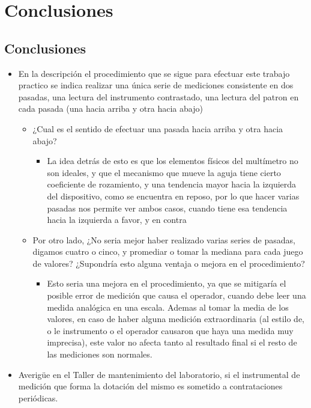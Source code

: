 \chapter{Conclusiones}
\section{Conclusiones}
\begin{itemize}
  \item En la descripción el procedimiento que se sigue para efectuar este trabajo practico se indica realizar una única serie de mediciones consistente en dos pasadas, una lectura del instrumento contrastado, una lectura del patron en cada pasada (una hacia arriba y otra hacia abajo)
  \begin{itemize}
    \item ¿Cual es el sentido de efectuar una pasada hacia arriba y otra hacia abajo?
    \begin{itemize} 
      \item La idea detrás de esto es que los elementos físicos del multímetro no son ideales, y que el mecanismo que mueve la aguja tiene cierto coeficiente de rozamiento, y una tendencia mayor hacia la izquierda del dispositivo, como se encuentra en reposo, por lo que hacer varias pasadas nos permite ver ambos casos, cuando tiene esa tendencia hacia la izquierda a favor, y en contra
    \end{itemize}
    \item Por otro lado, ¿No seria mejor haber realizado varias series de pasadas, digamos cuatro o cinco, y promediar o tomar la mediana para cada juego de valores? ¿Supondría esto alguna ventaja o mejora en el procedimiento?
      \begin{itemize}
        \item Esto seria una mejora en el procedimiento, ya que se mitigaría el posible error de medición que causa el operador, cuando debe leer una medida analógica en una escala.
          Ademas al tomar la media de  los valores, en caso de haber alguna medición extraordinaria (al estilo de, o le instrumento o el operador causaron que haya una medida muy imprecisa), este valor no afecta tanto al resultado final si el resto de las mediciones son normales.
      \end{itemize}
  \end{itemize}
  \item Averigüe en el Taller de mantenimiento del laboratorio, si el instrumental de medición que forma la dotación del mismo es sometido a contrataciones periódicas.

\end{itemize}
